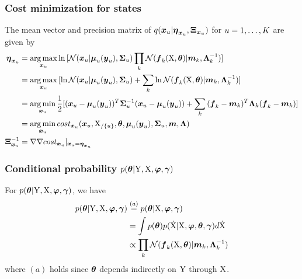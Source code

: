 \begin{frame}[t]
    \frametitle{Cost minimization for states}
    The mean vector and precision matrix of $q(\boldsymbol{x}_{u}\vert\boldsymbol{\eta}_{\boldsymbol{x}_{u}},\boldsymbol{\Xi}_{\boldsymbol{x}_{u}})$ for $u = 1,\dots,K$ are given by
    \begin{align}
        \boldsymbol{\eta}_{\boldsymbol{x}_{u}}
        & =     
        \operatorname*{arg\,max}_{\boldsymbol{x}_{u}}{
            \ln{[
                \mathcal{N}(\boldsymbol{x}_{u}\vert\boldsymbol{\mu}_{u}(\boldsymbol{y}_{u}),\boldsymbol{\Sigma}_{u})\prod_k{\mathcal{N}(\boldsymbol{f}_{k}(\mathrm{X}, \boldsymbol{\theta})\vert\boldsymbol{m}_{k},\boldsymbol{\Lambda}_{k}^{-1})}
            ]}
        }
        \nonumber
        \\
        & =     
        \operatorname*{arg\,max}_{\boldsymbol{x}_{u}}{[
            \ln{\mathcal{N}(\boldsymbol{x}_{u}\vert\boldsymbol{\mu}_{u}(\boldsymbol{y}_{u}),\boldsymbol{\Sigma}_{u})} 
            + \sum_k{
                \ln{\mathcal{N}(\boldsymbol{f}_{k}(\mathrm{X}, \boldsymbol{\theta})\vert\boldsymbol{m}_{k},\boldsymbol{\Lambda}_{k}^{-1})}
            }]}
        \nonumber
        \\
        & =
        \operatorname*{arg\,min}_{\boldsymbol{x}_{u}}{
            \frac{1}{2}[(\boldsymbol{x}_{u} - \boldsymbol{\mu}_{u}(\boldsymbol{y}_{u}))^T\boldsymbol{\Sigma}_{u}^{-1}(\boldsymbol{x}_{u} - \boldsymbol{\mu}_{u}(\boldsymbol{y}_{u}))
            + \sum_k{
                (\boldsymbol{f}_{k} - \boldsymbol{m}_{k})^T\boldsymbol{\Lambda}_{k}(\boldsymbol{f}_{k} - \boldsymbol{m}_{k})        
            }]
        }
        \nonumber
        \\
        & =
        \operatorname*{arg\,min}_{\boldsymbol{x}_{u}}{
            cost_{\boldsymbol{x}_{u}}(\boldsymbol{x}_{u},\mathrm{X}_{/\{u\}},\boldsymbol{\theta},\boldsymbol{\mu}_{u}(\boldsymbol{y}_{u}),\boldsymbol{\Sigma}_{u},\boldsymbol{m},\boldsymbol{\Lambda})
        }
        \label{eq-laplace-xu-cost}
        \\
        \boldsymbol{\Xi}_{\boldsymbol{x}_{u}}^{-1} 
        & = 
        \nabla\nabla cost_{\boldsymbol{x}_{u}}\vert_{\boldsymbol{x}_{u} = \boldsymbol{\eta}_{\boldsymbol{x}_{u}}}
        \label{eq-laplace-xu-covariance}
    \end{align}
\end{frame}

\begin{frame}[t]
    \frametitle{Conditional probability $p(\boldsymbol{\theta}\vert\mathrm{Y},\mathrm{X},\boldsymbol{\varphi},\boldsymbol{\gamma})$}
    For $p(\boldsymbol{\theta}\vert\mathrm{Y},\mathrm{X},\boldsymbol{\varphi},\boldsymbol{\gamma})$, we have
    \begin{align}
        p(\boldsymbol{\theta}\vert\mathrm{Y},\mathrm{X},\boldsymbol{\varphi},\boldsymbol{\gamma}) 
        & \stackrel{(a)}{=} 
        p(\boldsymbol{\theta}\vert\mathrm{X},\boldsymbol{\varphi},\boldsymbol{\gamma}) 
        \nonumber
        \\        
        & = 
        \int{
            p(\boldsymbol{\theta}) p(\mathrm{\dot{X}}\vert\mathrm{X},\boldsymbol{\ensuremath{\varphi}},\boldsymbol{\theta},\boldsymbol{\gamma})d\mathrm{\dot{X}}}
        \nonumber
        \\               
        & \propto 
        \prod_k{\mathcal{N}(\boldsymbol{f}_{k}(\mathrm{X}, \boldsymbol{\theta})\vert\boldsymbol{m}_{k},\boldsymbol{\Lambda}_{k}^{-1})}
        \label{eq-laplace-theta-objective}
    \end{align}
    where $(a)$ holds since $\boldsymbol{\theta}$ depends indirectly on $\mathrm{Y}$ through $\mathrm{X}$.
\end{frame}

